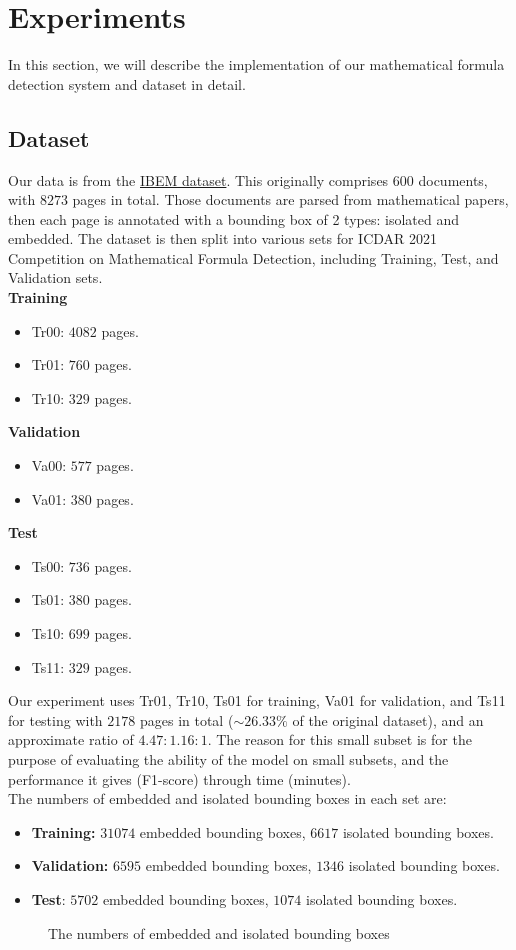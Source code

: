 \section{Experiments}
In this section, we will describe the implementation of our mathematical formula detection system and dataset in detail.
\subsection{Dataset}
Our data is from the \href{https://zenodo.org/record/4757865}{IBEM dataset}. This originally comprises $600$ documents, with $8273$ pages in total. Those documents are parsed from mathematical papers, then each page is annotated with a bounding box of 2 types: isolated and embedded. The dataset is then split into various sets for ICDAR 2021 Competition on Mathematical Formula Detection, including Training, Test, and Validation sets. \\
\textbf{Training}
\begin{itemize}
\item Tr00: $4082$ pages.
\item Tr01: $760$ pages.
\item Tr10: $329$ pages.
\end{itemize}
\textbf{Validation}
\begin{itemize}
\item Va00: $577$ pages.
\item Va01: $380$ pages.
\end{itemize}
\textbf{Test}
\begin{itemize}
\item Ts00: $736$ pages.
\item Ts01: $380$ pages.
\item Ts10: $699$ pages.
\item Ts11: $329$ pages.
\end{itemize}
Our experiment uses Tr01, Tr10, Ts01 for training, Va01 for validation, and Ts11 for testing with $2178$ pages in total ($ \sim 26.33\% $ of the original dataset), and an approximate ratio of $4.47:1.16:1.$ The reason for this small subset is for the purpose of evaluating the ability of the model on small subsets, and the performance it gives (F1-score) through time (minutes).\\
The numbers of embedded and isolated bounding boxes in each set are:
\begin{itemize}
\item \textbf{Training:} $31074$ embedded bounding boxes, $6617$ isolated bounding boxes.
\item \textbf{Validation:} $6595$ embedded bounding boxes, $1346$ isolated bounding boxes.
\item \textbf{Test}: $5702$ embedded bounding boxes, $1074$ isolated bounding boxes.
\end{itemize}
\begin{figure}[H]
\caption{The numbers of embedded and isolated bounding boxes}
\end{figure}

